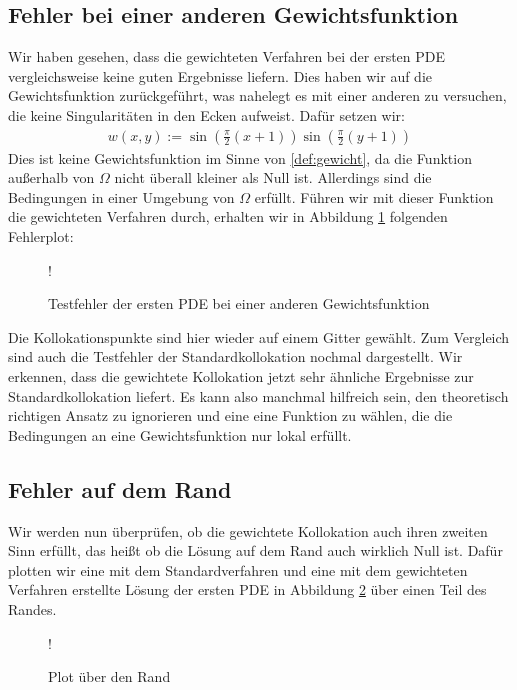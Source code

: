 \subsection{Fehler bei einer anderen Gewichtsfunktion}
\label{sec:andereGewicht}
Wir haben gesehen, dass die gewichteten Verfahren bei der ersten \ac{PDE} vergleichsweise keine guten Ergebnisse liefern. Dies haben wir auf die Gewichtsfunktion zurückgeführt, was nahelegt es mit einer anderen zu versuchen, die keine Singularitäten in den Ecken aufweist. Dafür setzen wir:
\begin{align*}
	w(x,y) := \sin\left(\frac{\pi}{2}(x+1)\right) \sin\left(\frac{\pi}{2}(y+1)\right)
\end{align*}
Dies ist keine Gewichtsfunktion im Sinne von \ref{def:gewicht}, da die Funktion außerhalb von $\Omega$ nicht überall kleiner als Null ist. Allerdings sind die Bedingungen in einer Umgebung von $\Omega$ erfüllt. Führen wir mit dieser Funktion die gewichteten Verfahren durch, erhalten wir in Abbildung \ref{fig:andereGewicht} folgenden Fehlerplot:
\begin{figure}[H]
	\centering
	\resizebox {\columnwidth} {!} {
		
	}
	\caption{Testfehler der ersten \ac{PDE} bei einer anderen Gewichtsfunktion}
	\label{fig:andereGewicht}
\end{figure}
Die Kollokationspunkte sind hier wieder auf einem Gitter gewählt. Zum Vergleich sind auch die Testfehler der Standardkollokation nochmal dargestellt. Wir erkennen, dass die gewichtete Kollokation jetzt sehr ähnliche Ergebnisse zur Standardkollokation liefert. Es kann also manchmal hilfreich sein, den theoretisch richtigen Ansatz zu ignorieren und eine eine Funktion zu wählen, die die Bedingungen an eine Gewichtsfunktion nur lokal erfüllt.

\subsection{Fehler auf dem Rand}
Wir werden nun überprüfen, ob die gewichtete Kollokation auch ihren zweiten Sinn erfüllt, das heißt ob die Lösung auf dem Rand auch wirklich Null ist. Dafür plotten wir eine mit dem Standardverfahren und eine mit dem gewichteten Verfahren erstellte Lösung der ersten \ac{PDE} in Abbildung \ref{fig:rand-vergleich} über einen Teil des Randes.

\begin{figure}[ht]
\centering
\resizebox {\columnwidth} {!} {

}
\caption{Plot über den Rand}
\label{fig:rand-vergleich}
\end{figure}

